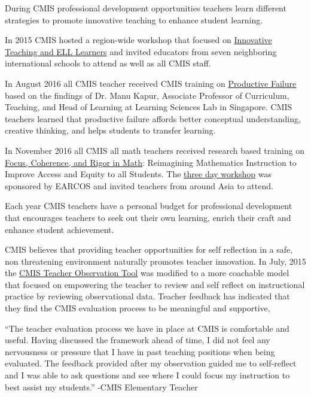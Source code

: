 \begin{findings}
During CMIS professional development opportunities teachers learn different strategies to promote innovative teaching to enhance student learning.


In 2015 CMIS hosted a region-wide workshop that focused on \href{https://docs.google.com/forms/d/e/1FAIpQLSdK2QvcDZyM_yfhT22BgModehhwhn3I8Ps6VoW2EIzaK-qing/viewform?c=0&w=1}{ Innovative Teaching and  ELL Learners} and invited educators from seven neighboring international schools to attend as well as all CMIS staff. 

In August 2016 all CMIS teacher received CMIS training on \href{https://docs.google.com/a/cmis.ac.th/presentation/d/1S1x1yEj7KDD6jM7u1RdTZJEt10_0r6mcJ-LmRb6iPWs/edit?usp=sharing}{Productive Failure}  based on the findings of Dr. Manu Kapur, Associate Professor of Curriculum, Teaching, and Head of Learning at Learning Sciences Lab in Singapore. CMIS teachers learned that productive failure affords better conceptual understanding, creative thinking, and helps students to transfer learning.

In November 2016 all CMIS all math teachers received research based training on \href{https://drive.google.com/a/cmis.ac.th/file/d/0ByVFfrm0zfolSXFEZFJVN1VOaTQ/view?usp=sharing}{Focus, Coherence, and Rigor in Math}: Reimagining Mathematics Instruction to Improve Access and Equity to all Students. The \href{https://docs.google.com/document/d/14wHOzYz9lk79YGv4aYLtMEkqAN0Z6vBBI3POYZPeIC4/edit?usp=sharing}{three day workshop} was sponsored by EARCOS and invited teachers from around Asia to attend. 

Each year CMIS teachers have a personal budget for professional development that encourages teachers to seek out their own learning, enrich their craft and enhance student achievement.

CMIS believes that providing teacher opportunities for self reflection in a safe, non threatening environment naturally promotes teacher innovation. In July, 2015 the \href{https://docs.google.com/document/d/15_5X5QtixmWVheEUBVO9N1aislsLDm_ZW4-4g4YQ7F4/edit?usp=sharing}{CMIS Teacher Observation Tool} was modified to a more coachable model that  focused on empowering the teacher to review and self reflect on instructional practice by reviewing observational data. Teacher feedback has indicated that they find the CMIS evaluation process to be meaningful and supportive,

``The teacher evaluation process we have in place at CMIS is comfortable and useful. Having discussed the framework ahead of time, I did not feel any nervousness or pressure that I have in past teaching positions when being evaluated. The feedback provided after my observation guided me to self-reflect and I was able to ask questions and see where I could focus my instruction to best assist my students.'' -CMIS Elementary Teacher


\end{findings}

